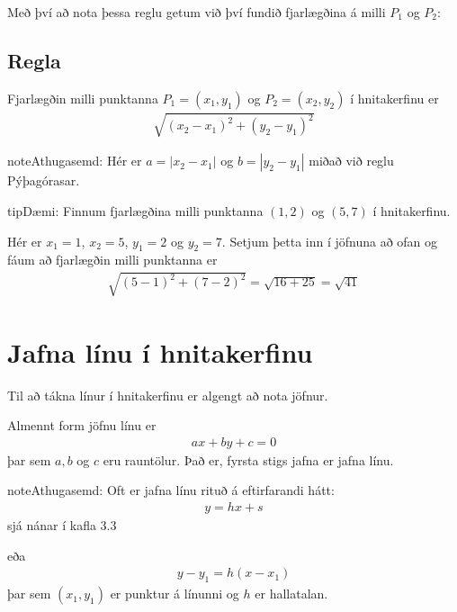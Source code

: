\documentclass[a4paper,10pt,icelandic]{sphinxmanual}
\begin{document}
Með því að nota þessa reglu getum við því fundið fjarlægðina á milli \(P_1\) og \(P_2\):


\subsection{Regla}
\label{\detokenize{Kafli03:regla}}
Fjarlægðin milli punktanna \(P_1=(x_1,y_1)\) og \(P_2=(x_2,y_2)\) í hnitakerfinu er
\begin{equation*}
\begin{split}\sqrt{(x_2-x_1)^2+(y_2-y_1)^2}\end{split}
\end{equation*}
\begin{sphinxadmonition}{note}{Athugasemd:}
Hér er \(a = |x_2-x_1|\) og \(b = |y_2-y_1|\) miðað við reglu Pýþagórasar.
\end{sphinxadmonition}

\begin{sphinxadmonition}{tip}{Dæmi:}
Finnum fjarlægðina milli punktanna \((1,2)\) og \((5,7)\) í hnitakerfinu.

Hér er \(x_1=1\), \(x_2=5\), \(y_1=2\) og \(y_2=7\). Setjum þetta inn í jöfnuna að ofan og fáum að fjarlægðin milli punktanna er
\begin{equation*}
\begin{split}\sqrt{(5-1)^2+(7-2)^2}=\sqrt{16+25}=\sqrt{41}\end{split}
\end{equation*}\end{sphinxadmonition}


\section{Jafna línu í hnitakerfinu}
\label{\detokenize{Kafli03:jafna-linu-i-hnitakerfinu}}
Til að tákna línur í hnitakerfinu er algengt að nota jöfnur.

Almennt form jöfnu línu er
\begin{equation*}
\begin{split}ax+by+c=0\end{split}
\end{equation*}
þar sem \(a,b\) og \(c\) eru rauntölur. Það er, fyrsta stigs jafna er jafna línu.

\begin{sphinxadmonition}{note}{Athugasemd:}
Oft er jafna línu rituð á eftirfarandi hátt:
\begin{equation*}
\begin{split}y=hx+s\end{split}
\end{equation*}
sjá nánar í kafla 3.3

eða
\begin{equation*}
\begin{split}y - y_1 = h(x - x_1)\end{split}
\end{equation*}
þar sem \((x_1,y_1)\) er punktur á línunni og \(h\) er hallatalan.
\end{sphinxadmonition}
\end{document}
